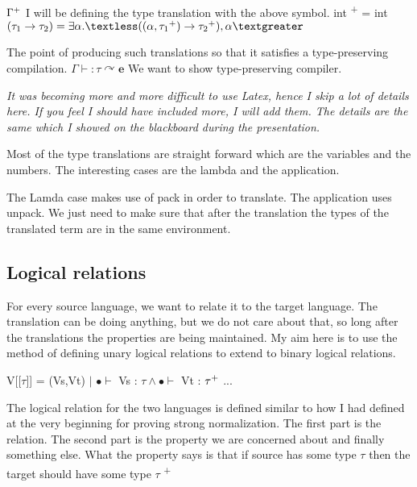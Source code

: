 \documentclass[10pt]{article}
\begin{document}
  $\Gamma \textsuperscript{+}$
  \vskip 0.2in
  I will be defining the type translation with the above symbol. 
  \vskip 0.2in
  int \textsuperscript{+} = int
  \vskip 0.1in
  $( \tau_1 \rightarrow \tau_2) = \exists \alpha. \textless((\alpha, \tau_1 \textsuperscript{+}) \rightarrow \tau_2 \textsuperscript{+}), \alpha \textgreater $
  
  \vskip 0.2in
  The point of producing such translations so that it satisfies a type-preserving compilation. 
  \vskip 0.2in
  $\Gamma \vdash : \tau \curvearrowright \textbf{e}$
  \vskip 0.2in
  We want to show type-preserving compiler. 
  
  \vskip 0.4in
  
  \textit{It was becoming more and more difficult to use Latex, hence I skip a lot of details here. If you feel I should have included more, I will add them. The details are the same which I showed on the blackboard during the presentation. }
  \vskip 0.2in
  
  Most of the type translations are straight forward which are the variables and the numbers. The interesting cases are the lambda and the application. 
  
 The Lamda case makes use of pack in order to translate. The application uses unpack. We just need to make sure that after the translation the types of the translated term are in the same environment. 
  
  
  \subsection{Logical relations}
  For every source language, we want to relate it to the target language. The translation can be doing anything, but we do not care about that, so long after the translations the properties are being maintained. 
  \vskip 0.2in
  My aim here is to use the method of defining unary logical relations to extend to binary logical relations. 
  
  \vskip 0.2in
   V[[$\tau$]] = { (Vs,Vt) $\lvert$ $\bullet \vdash$ Vs : $\tau \wedge \bullet \vdash$ Vt : $\tau \textsuperscript{+}$ ...}
   
   \vskip 0.2in
   The logical relation for the two languages is defined similar to how I had defined at the very beginning for proving strong normalization. 
   \vskip 0.1in
   The first part is the relation. The second part is the property we are concerned about and finally something else. 
   What the property says is that if source has some type $\tau$ then the target should have some type $\tau$ \textsuperscript{+}
   
\end{document}
